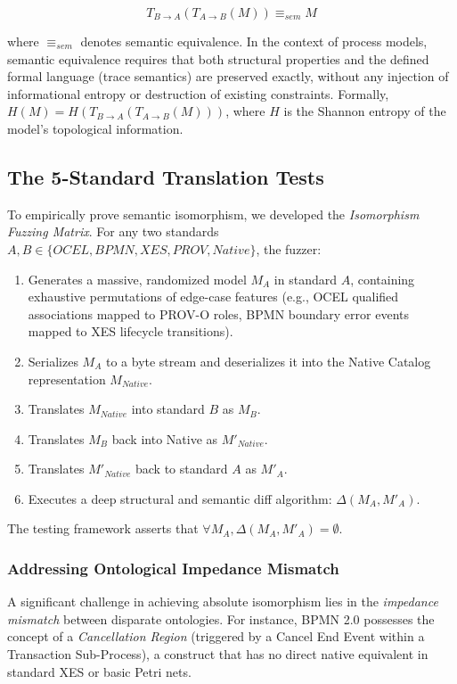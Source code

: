 $$ T_{B \to A}(T_{A \to B}(M)) \equiv_{sem} M $$

where $\equiv_{sem}$ denotes semantic equivalence. In the context of process models, semantic equivalence requires that both structural properties and the defined formal language (trace semantics) are preserved exactly, without any injection of informational entropy or destruction of existing constraints. Formally, $H(M) = H(T_{B \to A}(T_{A \to B}(M)))$, where $H$ is the Shannon entropy of the model's topological information.

\subsection{The 5-Standard Translation Tests}

To empirically prove semantic isomorphism, we developed the \textit{Isomorphism Fuzzing Matrix}. For any two standards $A, B \in \{OCEL, BPMN, XES, PROV, Native\}$, the fuzzer:
\begin{enumerate}
    \item Generates a massive, randomized model $M_A$ in standard $A$, containing exhaustive permutations of edge-case features (e.g., OCEL qualified associations mapped to PROV-O roles, BPMN boundary error events mapped to XES lifecycle transitions).
    \item Serializes $M_A$ to a byte stream and deserializes it into the Native Catalog representation $M_{Native}$.
    \item Translates $M_{Native}$ into standard $B$ as $M_B$.
    \item Translates $M_B$ back into Native as $M'_{Native}$.
    \item Translates $M'_{Native}$ back to standard $A$ as $M'_A$.
    \item Executes a deep structural and semantic diff algorithm: $\Delta(M_A, M'_A)$.
\end{enumerate}

The testing framework asserts that $\forall M_A, \Delta(M_A, M'_A) = \emptyset$.

\subsubsection{Addressing Ontological Impedance Mismatch}

A significant challenge in achieving absolute isomorphism lies in the \textit{impedance mismatch} between disparate ontologies. For instance, BPMN 2.0 possesses the concept of a \textit{Cancellation Region} (triggered by a Cancel End Event within a Transaction Sub-Process), a construct that has no direct native equivalent in standard XES or basic Petri nets.

